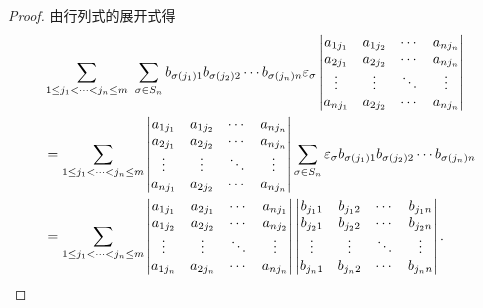 \documentclass[color=black,device=normal,lang=cn,mode=geye]{elegantnote}
\begin{document}
\begin{proof}
    由行列式的展开式得
    \begin{align*}
        & \sum\limits_{1\leq j_1<\cdots<j_n\leq m}\ \sum_{\sigma\in S_n}b_{\sigma(j_1)1}b_{\sigma(j_2)2}\cdots b_{\sigma(j_n)n}\varepsilon_\sigma\begin{vmatrix}
            a_{1j_1} & a_{1j_2} & \cdots & a_{nj_n} \\
            a_{2j_1} & a_{2j_2} & \cdots & a_{nj_n} \\
            \vdots & \vdots & \ddots & \vdots \\
            a_{nj_1} & a_{2j_2} & \cdots & a_{nj_n} \\
        \end{vmatrix} \\
        & =\sum\limits_{1\leq j_1<\cdots<j_n\leq m}\begin{vmatrix}
            a_{1j_1} & a_{1j_2} & \cdots & a_{nj_n} \\
            a_{2j_1} & a_{2j_2} & \cdots & a_{nj_n} \\
            \vdots & \vdots & \ddots & \vdots \\
            a_{nj_1} & a_{2j_2} & \cdots & a_{nj_n} \\
        \end{vmatrix}\sum_{\sigma\in S_n}\varepsilon_\sigma b_{\sigma(j_1)1}b_{\sigma(j_2)2}\cdots b_{\sigma(j_n)n} \\
        & =\sum\limits_{1\leq j_1<\cdots<j_n\leq m}\begin{vmatrix}
            a_{1j_1} & a_{2j_1} & \cdots & a_{nj_1} \\
            a_{1j_2} & a_{2j_2} & \cdots & a_{nj_2} \\
            \vdots & \vdots & \ddots & \vdots \\
            a_{1j_n} & a_{2j_n} & \cdots & a_{nj_n} \\
        \end{vmatrix}\begin{vmatrix}
            b_{j_11} & b_{j_12} & \cdots & b_{j_1n} \\
            b_{j_21} & b_{j_22} & \cdots & b_{j_2n} \\
            \vdots & \vdots & \ddots & \vdots \\
            b_{j_n1} & b_{j_n2} & \cdots & b_{j_nn} \\
        \end{vmatrix}.\qedhere
    \end{align*}
\end{proof}
\end{document}
